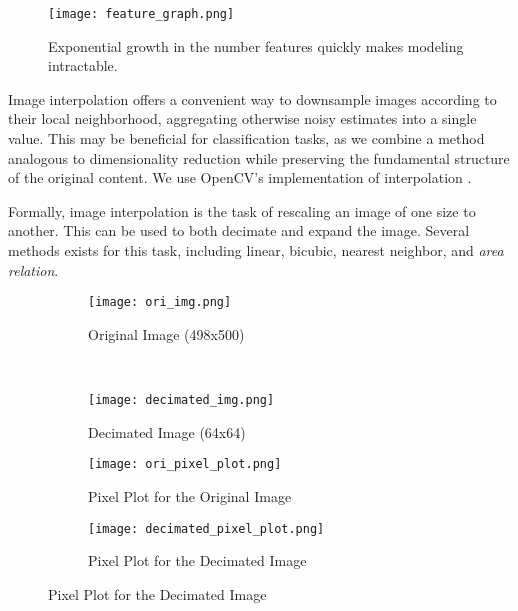 \documentclass{article}
\begin{document}
\begin{figure}
  \centering
  \texttt{[image: feature\_graph.png]}
  \vspace{-5pt}
  \caption{Exponential growth in the number features quickly makes modeling intractable.}
  \label{fig:feature-size}
\end{figure}

Image interpolation offers a convenient way to downsample images according to
their local neighborhood, aggregating otherwise noisy estimates into a single
value. This may be beneficial for classification tasks, as we combine a method
analogous to dimensionality reduction while preserving the fundamental structure of
the original content. We use OpenCV's implementation of interpolation \cite{opencv}.

Formally, image interpolation is the task of rescaling an image of one size
to another. This can be used to both decimate and expand the image. Several
methods exists for this task, including linear, bicubic, nearest neighbor, and
\textit{area relation}.

\begin{figure}
  \centering
  \caption{Results of Interpolating a 249,000 pixel image to a 4,096 pixel image.}
  \label{fig:interpolation}
  \begin{subfigure}[b]{0.45\textwidth}
    \centering
    \texttt{[image: ori\_img.png]}
    \vspace{-13pt}
    \caption{Original Image (498x500)}
    \label{fig:ori-image}
  \end{subfigure}
  ~
  \begin{subfigure}[b]{0.45\textwidth}
    \centering
    \texttt{[image: decimated\_img.png]}
    \vspace{-13pt}
    \caption{Decimated Image (64x64)}
    \label{fig:reduced-img}
  \end{subfigure}

  \begin{subfigure}[b]{1.\textwidth}
    \centering
    \texttt{[image: ori\_pixel\_plot.png]}
    \caption{Pixel Plot for the Original Image}
    \label{fig:ori-pixel-plot}
  \end{subfigure}

  \begin{subfigure}[b]{1.\textwidth}
    \centering
    \texttt{[image: decimated\_pixel\_plot.png]}
    \caption{Pixel Plot for the Decimated Image}
    \label{fig:reduced-pixel-plot}
  \end{subfigure}
\end{figure}
\end{document}
